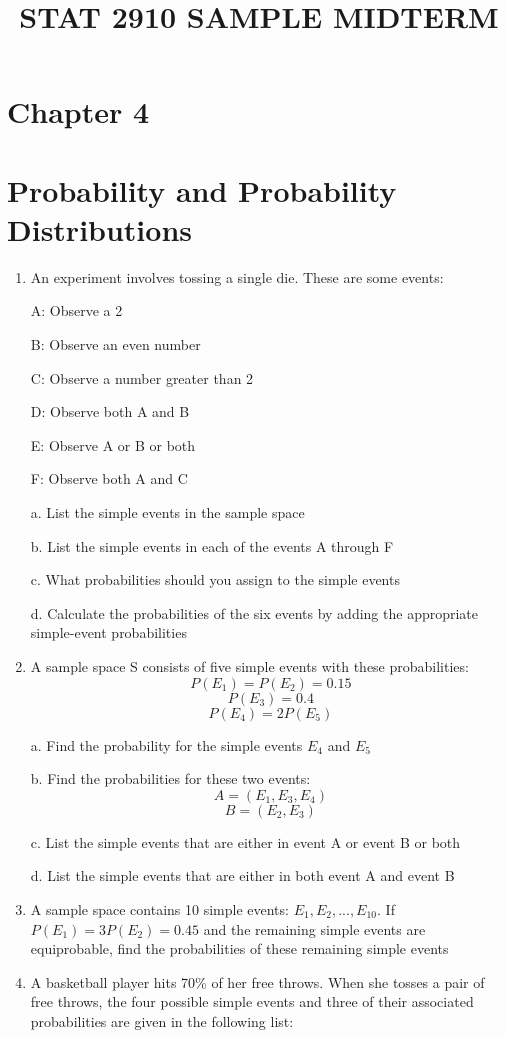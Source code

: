 \documentclass{article}
\title{STAT 2910 SAMPLE MIDTERM}
\begin{document}
\maketitle

\section*{Chapter 4}
\section*{Probability and Probability Distributions}

\begin{enumerate}
    \item An experiment involves tossing a single die. These are some events:
    
    A: Observe a 2

    B: Observe an even number

    C: Observe a number greater than 2

    D: Observe both A and B

    E: Observe A or B or both

    F: Observe both A and C 
    
    \hfill \break a. List the simple events in the sample space

    b. List the simple events in each of the events A through F

    c. What probabilities should you assign to the simple events

    d. Calculate the probabilities of the six events by adding the appropriate simple-event probabilities
    
    \item A sample space S consists of five simple events with these probabilities:
    $$P(E_1) = P(E_2) = 0.15$$
    $$P(E_3) = 0.4$$
    $$P(E_4) = 2P(E_5)$$
    
     a. Find the probability for the simple events $E_4$ and $E_5$
    
     b. Find the probabilities for these two events:
        $$A = (E_1, E_3, E_4)$$
        $$B = (E_2, E_3)$$
   
    c. List the simple events that are either in event A or event B or both

    d. List the simple events that are either in both event A and event B
    
    \item A sample space contains 10 simple events: $E_1, E_2,...,E_10$. If $P(E_1) = 3P(E_2) = 0.45$ and the remaining simple events are equiprobable, find the probabilities of these remaining simple events
    \item A basketball player hits 70\% of her free throws. When she tosses a pair of free throws, the four possible simple events and three of their associated probabilities are given in the following list:
    

\end{enumerate}
\end{document}
